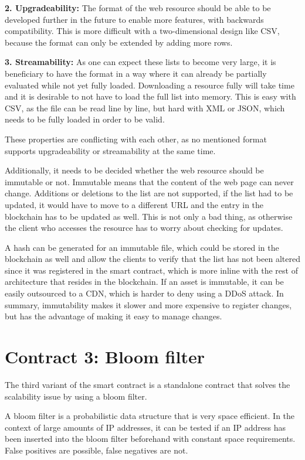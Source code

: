 \textbf{2. Upgradeability:} The format of the web resource should be able to be developed further in the future to enable more features, with backwards compatibility. This is more difficult with a two-dimensional design like CSV, because the format can only be extended by adding more rows.

\textbf{3. Streamability:} As one can expect these lists to become very large, it is beneficiary to have the format in a way where it can already be partially evaluated while not yet fully loaded. Downloading a resource fully will take time and it is desirable to not have to load the full list into memory. This is easy with CSV, as the file can be read line by line, but hard with XML or JSON, which needs to be fully loaded in order to be valid.


These properties are conflicting with each other, as no mentioned format supports upgradeability or streamability at the same time.

Additionally, it needs to be decided whether the web resource should be immutable or not. Immutable means that the content of the web page can never change. Additions or deletions to the list are not supported, if the list had to be updated, it would have to move to a different URL and the entry in the blockchain has to be updated as well. This is not only a bad thing, as otherwise the client who accesses the resource has to worry about checking for updates.

A hash can be generated for an immutable file, which could be stored in the blockchain as well and allow the clients to verify that the list has not been altered since it was registered in the smart contract, which is more inline with the rest of architecture that resides in the blockchain. If an asset is immutable, it can be easily outsourced to a CDN, which is harder to deny using a DDoS attack.
In summary, immutability makes it slower and more expensive to register changes, but has the advantage of making it easy to manage changes.

\section{Contract 3: Bloom filter}

The third variant of the smart contract is a standalone contract that solves the scalability issue by using a bloom filter.

A bloom filter is a probabilistic data structure that is very space efficient. In the context of large amounts of IP addresses, it can be tested if an IP address has been inserted into the bloom filter beforehand with constant space requirements. False positives are possible, false negatives are not.

